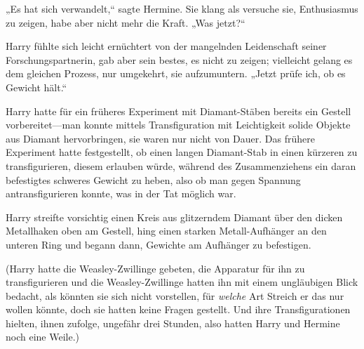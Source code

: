 „Es hat sich verwandelt,“ sagte Hermine. Sie klang als versuche sie, Enthusiasmus zu zeigen, habe aber nicht mehr die Kraft. „Was jetzt?“

Harry fühlte sich leicht ernüchtert von der mangelnden Leidenschaft seiner Forschungspartnerin, gab aber sein bestes, es nicht zu zeigen; vielleicht gelang es dem gleichen Prozess, nur umgekehrt, sie aufzumuntern. „Jetzt prüfe ich, ob es Gewicht hält.“

Harry hatte für ein früheres Experiment mit Diamant-Stäben bereits ein Gestell vorbereitet—man konnte mittels Transfiguration mit Leichtigkeit solide Objekte aus Diamant hervorbringen, sie waren nur nicht von Dauer. Das frühere Experiment hatte festgestellt, ob einen langen Diamant-Stab in einen kürzeren zu transfigurieren, diesem erlauben würde, während des Zusammenziehens ein daran befestigtes schweres Gewicht zu heben, also ob man gegen Spannung antransfigurieren konnte, was in der Tat möglich war.

Harry streifte vorsichtig einen Kreis aus glitzerndem Diamant über den dicken Metallhaken oben am Gestell, hing einen starken Metall-Aufhänger an den unteren Ring und begann dann, Gewichte am Aufhänger zu befestigen.

(Harry hatte die Weasley-Zwillinge gebeten, die Apparatur für ihn zu transfigurieren und die Weasley-Zwillinge hatten ihn mit einem ungläubigen Blick bedacht, als könnten sie sich nicht vorstellen, für \emph{welche} Art Streich er das nur wollen könnte, doch sie hatten keine Fragen gestellt. Und ihre Transfigurationen hielten, ihnen zufolge, ungefähr drei Stunden, also hatten Harry und Hermine noch eine Weile.)

